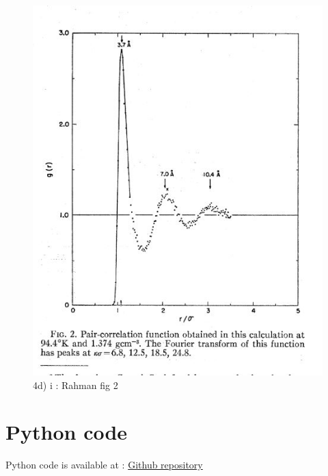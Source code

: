 \documentclass[a4paper,10pt,english]{article}
\begin{document}
\begin{figure}[h!]
        \centering 
        \includegraphics[scale=0.9]{./py/img/Rahman2.jpg} 
        \caption{4d) i : Rahman fig 2 }
        \label{fig:Rahman2}
\end{figure}

\section{Python code}
Python code is available at : 
\href{https://github.com/herreovertidogrom/prosjektMolekyl}{Github repository} 
\end{document}
